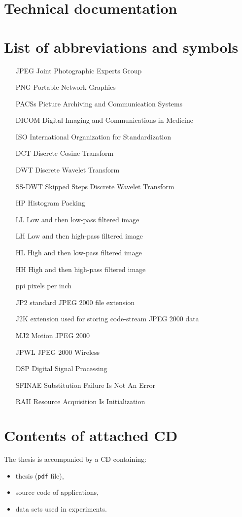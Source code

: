 \chapter*{Technical documentation}

\chapter*{List of abbreviations and symbols}

\begin{itemize}
\item[JPEG] Joint Photographic Experts Group
\item[PNG] Portable Network Graphics
\item[PACSs] Picture Archiving and Communication Systems
\item[DICOM] Digital Imaging and Communications in Medicine
\item[ISO] International Organization for Standardization
\item[DCT] Discrete Cosine Transform
\item[DWT] Discrete Wavelet Transform
\item[SS-DWT] Skipped Steps Discrete Wavelet Transform
\item[HP] Histogram Packing
\item[LL] Low and then low-pass filtered image
\item[LH] Low and then high-pass filtered image
\item[HL] High and then low-pass filtered image
\item[HH] High and then high-pass filtered image
\item[ppi] pixels per inch
\item[JP2] standard JPEG 2000 file extension
\item[J2K] extension used for storing code-stream JPEG 2000 data
\item[MJ2] Motion JPEG 2000
\item[JPWL] JPEG 2000 Wireless
\item[DSP] Digital Signal Processing
\item[SFINAE] Substitution Failure Is Not An Error
\item[RAII] Resource Acquisition Is Initialization
\end{itemize}

\chapter*{Contents of attached CD}

The thesis is accompanied by a CD containing:
\begin{itemize}
\item thesis (\texttt{pdf} file),
\item source code of applications,
\item data sets used in experiments.
\end{itemize}
